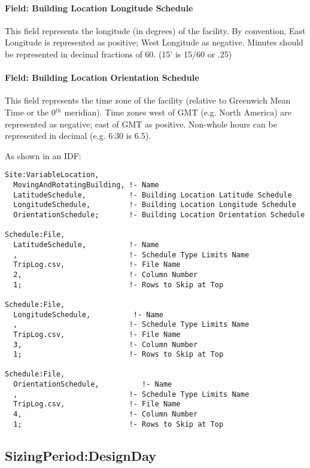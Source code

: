 \paragraph{Field: Building Location Longitude Schedule}\label{field-building-location-longitude-schedule}

This field represents the longitude (in degrees) of the facility. By convention, East Longitude is represented as positive; West Longitude as negative. Minutes should be represented in decimal fractions of 60. (15' is 15/60 or .25)

\paragraph{Field: Building Location Orientation Schedule}\label{field-building-location-orientation-schedule}

This field represents the time zone of the facility (relative to Greenwich Mean Time or the 0\(^{th}\) meridian). Time zones west of GMT (e.g. North America) are represented as negative; east of GMT as positive. Non-whole hours can be represented in decimal (e.g. 6:30 is 6.5).

As shown in an IDF:

\begin{lstlisting}
Site:VariableLocation,
  MovingAndRotatingBuilding, !- Name
  LatitudeSchedule,          !- Building Location Latitude Schedule
  LongitudeSchedule,         !- Building Location Longitude Schedule
  OrientationSchedule;       !- Building Location Orientation Schedule

Schedule:File,
  LatitudeSchedule,          !- Name
  ,                          !- Schedule Type Limits Name
  TripLog.csv,               !- File Name
  2,                         !- Column Number
  1;                         !- Rows to Skip at Top

Schedule:File,
  LongitudeSchedule,          !- Name
  ,                          !- Schedule Type Limits Name
  TripLog.csv,               !- File Name
  3,                         !- Column Number
  1;                         !- Rows to Skip at Top

Schedule:File,
  OrientationSchedule,          !- Name
  ,                          !- Schedule Type Limits Name
  TripLog.csv,               !- File Name
  4,                         !- Column Number
  1;                         !- Rows to Skip at Top
\end{lstlisting}

\subsection{SizingPeriod:DesignDay}\label{sizingperioddesignday}

